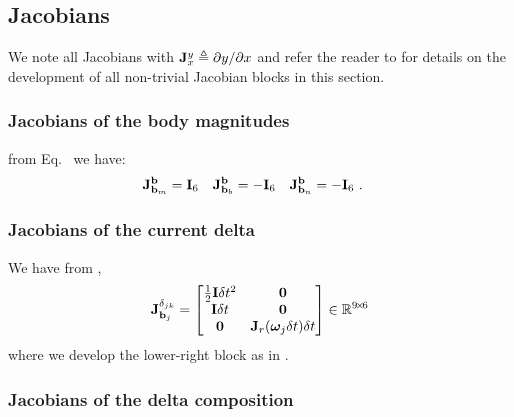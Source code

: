 \subsection{Jacobians}

\newcommand{\jac}[2]{{\bfJ^{#1}_{#2}}}

We note all Jacobians with $\jac{y}{x}\te\dparil{y}{x}$ and refer the reader to  for details on the development of all non-trivial Jacobian blocks in this section.



\subsubsection{Jacobians of the body magnitudes}

from  Eq.~ we have:
%
\begin{align}\label{equ:jac_body}
\jac{\bfb}{\bfb_m}&=\bfI_6 & \jac{\bfb}{\bfb_b}&=-\bfI_6 & \jac{\bfb}{\bfb_n}&=-\bfI_6
~.
\end{align}

\subsubsection{Jacobians of the current delta}
\label{sec:jac_data}

We have from ,
%
\begin{align}\label{equ:jac_current_delta}
\jac{\delta_{jk}}{\bfb_j} =
\begin{bmatrix}
\frac12\bfI\dt^2 	& \bf0 \\
\bfI\dt 			& \bf0 \\
\bf0 	          & \bfJ_r(\bw_j\dt)\dt
\end{bmatrix} 
\in \bbR^{9\tcross6}
\end{align}
%
where we develop the lower-right block as in .





\subsubsection{Jacobians of the delta composition}

